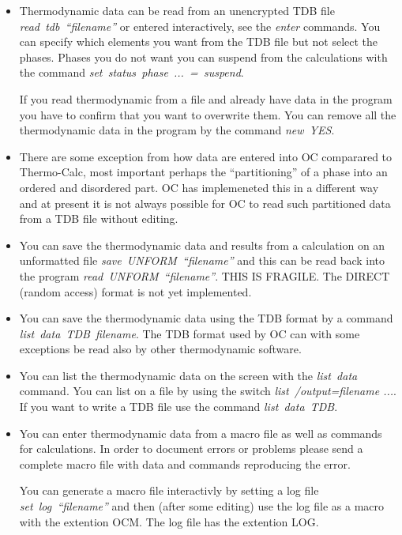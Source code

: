 \documentclass[12pt]{article}
\begin{document}
\begin{itemize}
\item Thermodynamic data can be read from an unencrypted TDB file {\em
  read~tdb~``filename''} or entered interactively, see the {\em enter}
  commands.  You can specify which elements you want from the TDB file
  but not select the phases.  Phases you do not want you can suspend
  from the calculations with the command {\em
    set~status~phase~...~=~suspend}.

  If you read thermodynamic from a file and already have data in the
  program you have to confirm that you want to overwrite them.  You can
  remove all the thermodynamic data in the program by the command {\em
    new~YES}.

\item There are some exception from how data are entered into OC
  comparared to Thermo-Calc, most important perhaps the
  ``partitioning'' of a phase into an ordered and disordered part.  OC
  has implemeneted this in a different way and at present it is not
  always possible for OC to read such partitioned data from a TDB file
  without editing.

\item You can save the thermodynamic data and results from a
  calculation on an unformatted file {\em save~UNFORM~``filename''}
  and this can be read back into the program {\em
    read~UNFORM~``filename''}.  THIS IS FRAGILE.  The DIRECT (random
  access) format is not yet implemented.

\item You can save the thermodynamic data using the TDB format by a
  command {\em list~data~TDB~filename}.  The TDB format used by OC can
  with some exceptions be read also by other thermodynamic software.

\item You can list the thermodynamic data on the screen with the {\em
  list~data} command.  You can list on a file by using the switch {\em
  list~/output=filename ...}.  If you want to write a TDB file use the
  command {\em list~data~TDB}.
  
\item You can enter thermodynamic data from a macro file as well as
  commands for calculations.  In order to document errors or problems
  please send a complete macro file with data and commands reproducing
  the error.  

  You can generate a macro file interactivly by setting a log file
  {\em set~log~``filename''} and then (after some editing) use the log
  file as a macro with the extention OCM.  The log file has the
  extention LOG.

\end{itemize}
\end{document}
